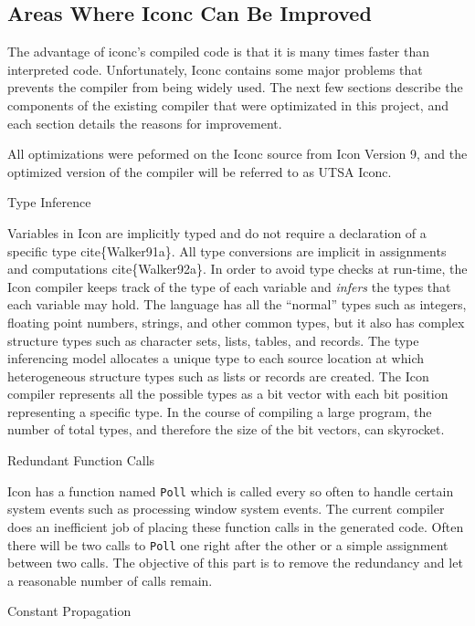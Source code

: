 \subsection{Areas Where Iconc Can Be Improved}

The advantage of iconc's compiled code is that it is many times faster
than interpreted code. Unfortunately, Iconc contains some major
problems that prevents the compiler from being widely used. The next
few sections describe the components of the existing compiler that
were optimizated in this project, and each section details the reasons
for improvement.

All optimizations were peformed on the Iconc source from Icon Version
9, and the optimized version of the compiler will be referred to as
UTSA Iconc.

\bigskip

{\sffamily
Type Inference}

Variables in Icon are implicitly typed and do not require a
declaration of a specific type cite\{Walker91a\}. All type conversions
are implicit in assignments and computations cite\{Walker92a\}. In
order to avoid type checks at run-time, the Icon compiler keeps track
of the type of each variable and \textit{infers} the types that each
variable may hold. The language has all the ``normal'' types such as
integers, floating point numbers, strings, and other common types, but
it also has complex structure types such as character sets, lists,
tables, and records. The type inferencing model allocates a unique
type to each source location at which heterogeneous structure types
such as lists or records are created. The Icon compiler represents all
the possible types as a bit vector with each bit position representing
a specific type. In the course of compiling a large program, the
number of total types, and therefore the size of the bit vectors, can
skyrocket.

{\sffamily
Redundant Function Calls}

Icon has a function named \texttt{Poll} which is called every so often
to handle certain system events such as processing window system
events. The current compiler does an inefficient job of placing these
function calls in the generated code. Often there will be two calls to
\texttt{Poll} one right after the other or a simple assignment between
two calls. The objective of this part is to remove the redundancy and
let a reasonable number of calls remain.

{\sffamily
Constant Propagation}

